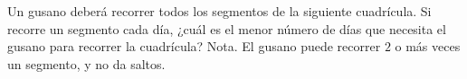 Un gusano deberá recorrer todos los segmentos de la siguiente cuadrícula. Si recorre un segmento cada día, ¿cuál es el menor número de días que necesita el gusano para recorrer la cuadrícula? \newline 
Nota. El gusano puede recorrer $2$ o más veces un segmento, y no da saltos.